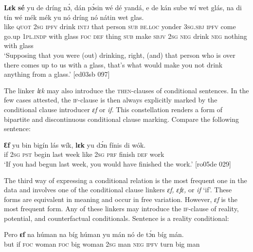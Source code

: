 \ea%
    \label{ex:key:1521}
    \gll \textbf{Lɛk}  \textbf{sé}    yu  de    dríng  nɔ́,  dán    pɔ́sin  wé   dé    yandá,  
e    de  kán    sube    wí    wet    glás,    na  di  tín  
wé    mék    mék    yu  nó  dríng  nó  nátin  wet    glas.\\
like  \textsc{quot}    \textsc{2sg}  \textsc{ipfv}    drink  \textsc{intj}  that    person  \textsc{sub}  \textsc{be.loc}  yonder
\textsc{3sg.sbj}  \textsc{ipfv}  come  go.up  \textsc{1pl.indp}  with    glass   \textsc{foc}  \textsc{def}  thing
\textsc{sub}    make  \textsc{sbjv}    \textsc{2sg}  \textsc{neg}  drink   \textsc{neg}  nothing  with    glass\\

\glt ‘Supposing that you were (out) drinking, right, (and) that person who
is over there comes up to us with a glass, that’s what would make you
not drink anything from a glass.’ [ed03sb 097]
\z

The linker \textit{lɛk} may also introduce the \textsc{then-}clauses of conditional sentences. In the few cases attested, the \textsc{if-}clause is then always explicitly marked by the conditional clause introducer \textit{ɛf} or \textit{if}.\textit{} This constellation renders a form of bipartite and discontinuous conditional clause marking. Compare the following sentence:


\ea%
    \label{ex:key:1522}
    \gll \textbf{Ɛf}  yu  bin  bigín  lás  wík,    \textbf{lɛk}  yu  dɔ́n  fínis    di  wók.\\
if  \textsc{2sg}  \textsc{pst}  begin  last  week  like  \textsc{2sg}  \textsc{prf}  finish  \textsc{def}  work\\

\glt ‘If you had begun last week, you would have finished the work.’ [ro05de 029]
\z

The third way of expressing a conditional relation is the most frequent one in the data and involves one of the conditional clause linkers \textit{ɛf, ɛfɛ}\textit{,} or\textit{ if} ‘if’. These forms are equivalent in meaning and occur in free variation. However, \textit{ɛf} is the most frequent form. Any of these linkers may introduce the \textsc{if-}clause of reality, potential, and counterfactual conditionals. Sentence  is a reality conditional: 


\ea%
    \label{ex:key:1523}
    \gll Pero    \textbf{ɛf}  na  húman  na  bíg  húman  yu  mán  
nó  de  tɔ́n  bíg  mán.\\
but    if  \textsc{foc}  woman  \textsc{foc}  big  woman  \textsc{2sg}  man  
\textsc{neg}  \textsc{ipfv}  turn  big  man\\


